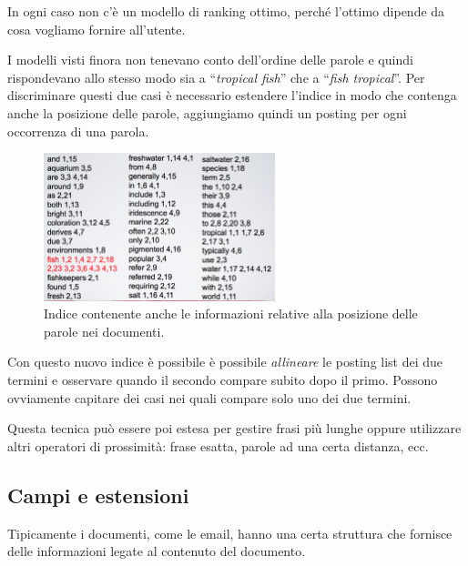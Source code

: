 



In ogni caso non c'è un modello di ranking ottimo, perché l'ottimo dipende da cosa vogliamo fornire all'utente.

I modelli visti finora non tenevano conto dell'ordine delle parole e quindi rispondevano allo stesso modo sia a ``\textit{tropical fish}'' che a ``\textit{fish tropical}''.
Per discriminare questi due casi è necessario estendere l'indice in modo che contenga anche la posizione delle parole, aggiungiamo quindi un posting per ogni occorrenza di una parola.

\begin{figure}[htbp]
	\centering
	\includegraphics[width=0.6\textwidth]{./images/l7-indice-pos}
	\caption{Indice contenente anche le informazioni relative alla posizione delle parole nei documenti.}
\end{figure}

\noindent Con questo nuovo indice è possibile è possibile \textit{allineare} le posting list dei due termini e osservare quando il secondo compare subito dopo il primo.
Possono ovviamente capitare dei casi nei quali compare solo uno dei due termini.

Questa tecnica può essere poi estesa per gestire frasi più lunghe oppure utilizzare altri operatori di prossimità: frase esatta, parole ad una certa distanza, ecc.

\subsection{Campi e estensioni}

Tipicamente i documenti, come le email, hanno una certa struttura che fornisce delle informazioni legate al contenuto del documento.

